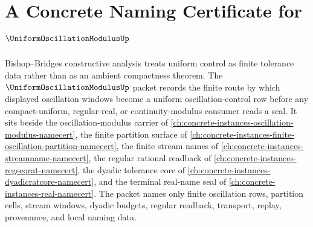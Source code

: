 \chapter{A Concrete Naming Certificate for $\UniformOscillationModulusUp$}
\label{ch:concrete-instances-uniform-oscillation-modulus-namecert}

Bishop--Bridges constructive analysis treats uniform control as finite tolerance data rather than as an ambient compactness theorem. The $\UniformOscillationModulusUp$ packet records the finite route by which displayed oscillation windows become a uniform oscillation-control row before any compact-uniform, regular-real, or continuity-modulus consumer reads a seal. It sits beside the oscillation-modulus carrier of \autoref{ch:concrete-instances-oscillation-modulus-namecert}, the finite partition surface of \autoref{ch:concrete-instances-finite-oscillation-partition-namecert}, the finite stream names of \autoref{ch:concrete-instances-streamname-namecert}, the regular rational readback of \autoref{ch:concrete-instances-regseqrat-namecert}, the dyadic tolerance core of \autoref{ch:concrete-instances-dyadicratcore-namecert}, and the terminal real-name seal of \autoref{ch:concrete-instances-real-namecert}. The packet names only finite oscillation rows, partition cells, stream windows, dyadic budgets, regular readback, transport, replay, provenance, and local naming data.

